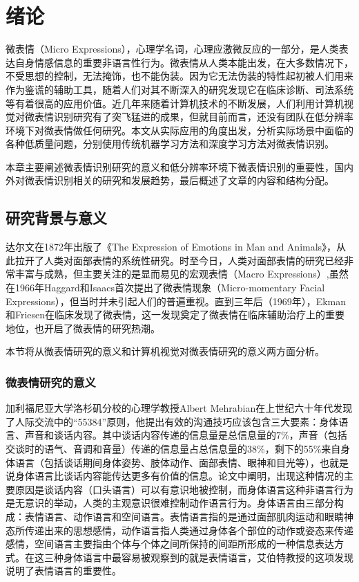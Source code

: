 \chapter{绪论}\label{chap:introduction}

微表情（Micro Expressions），心理学名词，心理应激微反应的一部分，是人类表达自身情感信息的重要非语言性行为。微表情从人类本能出发，在大多数情况下，不受思想的控制，无法掩饰，也不能伪装\citep{Haggard1966}。因为它无法伪装的特性起初被人们用来作为鉴谎的辅助工具，随着人们对其不断深入的研究发现它在临床诊断、司法系统等有着很高的应用价值。近几年来随着计算机技术的不断发展，人们利用计算机视觉对微表情识别研究有了突飞猛进的成果，但就目前而言，还没有团队在低分辨率环境下对微表情做任何研究。本文从实际应用的角度出发，分析实际场景中面临的各种低质量问题，分别使用传统机器学习方法和深度学习方法对微表情识别。

本章主要阐述微表情识别研究的意义和低分辨率环境下微表情识别的重要性，国内外对微表情识别相关的研究和发展趋势，最后概述了文章的内容和结构分配。

\section{研究背景与意义}

达尔文在1872年出版了《The Expression of Emotions in Man and Animals》，从此拉开了人类对面部表情的系统性研究。时至今日，人类对面部表情的研究已经非常丰富与成熟，但主要关注的是显而易见的宏观表情（Macro Expressions）,虽然在1966年Haggard和Isaacs首次提出了微表情现象（Micro-momentary Facial Expressions），但当时并未引起人们的普遍重视。直到三年后（1969年），Ekman和Friesen在临床发现了微表情，这一发现奠定了微表情在临床辅助治疗上的重要地位\citep{ekman1969nonverbal}，也开启了微表情的研究热潮。

本节将从微表情研究的意义和计算机视觉对微表情研究的意义两方面分析。

\subsection{微表情研究的意义}

加利福尼亚大学洛杉矶分校的心理学教授Albert Mehrabian在上世纪六十年代发现了人际交流中的“55384”原则，他提出有效的沟通技巧应该包含三大要素：身体语言、声音和谈话内容\citep{Mehrabian1967Inference}。其中谈话内容传递的信息量是总信息量的7\%，声音（包括交谈时的语气、音调和音量）传递的信息量占总信息量的38\%，剩下的55\%来自身体语言（包括谈话期间身体姿势、肢体动作、面部表情、眼神和目光等），也就是说身体语言比谈话内容能传达更多有价值的信息。论文中阐明，出现这种情况的主要原因是谈话内容（口头语言）可以有意识地被控制，而身体语言这种非语言行为是无意识的举动，人类的主观意识很难控制动作语言行为。身体语言由三部分构成：表情语言、动作语言和空间语言。表情语言指的是通过面部肌肉运动和眼睛神态所传递出来的思想感情，动作语言指人类通过身体各个部位的动作或姿态来传递感情，空间语言主要指由个体与个体之间所保持的间距所形成的一种信息表达方式。在这三种身体语言中最容易被观察到的就是表情语言，艾伯特教授的这项发现说明了表情语言的重要性。

